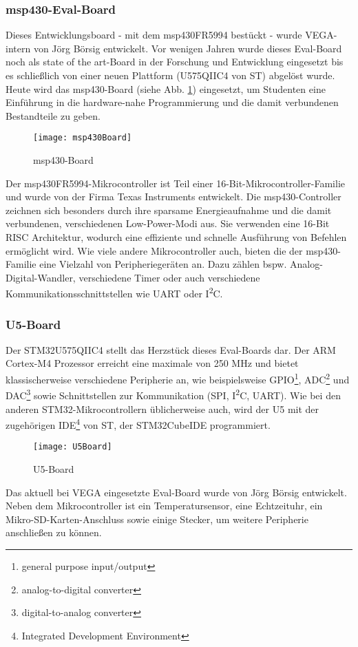 \documentclass[
	letterpaper, %
	10pt, %
]{CSUniSchoolLabReport}
\begin{document}
\begin{spacing}{1.6}
\subsubsection{msp430-Eval-Board}
Dieses Entwicklungsboard - mit dem msp430FR5994 bestückt - wurde VEGA-intern von Jörg Börsig entwickelt. Vor wenigen Jahren wurde dieses Eval-Board noch als \glqq state of the art\grqq -Board in der Forschung und Entwicklung eingesetzt bis es schließlich von einer neuen Plattform (U575QIIC4 von ST) abgelöst wurde. Heute wird das msp430-Board (siehe Abb. \ref{fig:msp430}) eingesetzt, um Studenten eine Einführung in die hardware-nahe Programmierung und die damit verbundenen Bestandteile zu geben.\\
\begin{figure}[H]
    \centering
    \texttt{[image: msp430Board]}
    \caption{msp430-Board}
    \label{fig:msp430}
\end{figure}
Der msp430FR5994-Mikrocontroller ist Teil einer 16-Bit-Mikrocontroller-Familie und wurde von der Firma Texas Instruments entwickelt. Die msp430-Controller zeichnen sich besonders durch ihre sparsame Energieaufnahme und die damit verbundenen, verschiedenen Low-Power-Modi aus. Sie verwenden eine 16-Bit RISC Architektur, wodurch eine effiziente und schnelle Ausführung von Befehlen ermöglicht wird. Wie viele andere Mikrocontroller auch, bieten die der msp430-Familie eine Vielzahl von Peripheriegeräten an. Dazu zählen bspw. Analog-Digital-Wandler, verschiedene Timer oder auch verschiedene Kommunikationsschnittstellen wie UART oder I\textsuperscript{2}C.\\

\subsubsection{U5-Board}
Der STM32U575QIIC4 stellt das Herzstück dieses Eval-Boards dar. Der ARM Cortex-M4 Prozessor erreicht eine maximale von 250 MHz und bietet klassischerweise verschiedene Peripherie an, wie beispielsweise GPIO\footnote{general purpose input/output}, ADC\footnote{analog-to-digital converter} und DAC\footnote{digital-to-analog converter} sowie Schnittstellen zur Kommunikation (SPI, I\textsuperscript{2}C, UART). Wie bei den anderen STM32-Mikrocontrollern üblicherweise auch, wird der U5 mit der zugehörigen IDE\footnote{Integrated Development Environment} von ST, der \glqq STM32CubeIDE\grqq $ $ programmiert.
\begin{figure}[H]
    \centering
    \texttt{[image: U5Board]}
    \caption{U5-Board}
    \label{fig:U5}
\end{figure}
Das aktuell bei VEGA eingesetzte Eval-Board wurde von Jörg Börsig entwickelt. Neben dem Mikrocontroller ist ein Temperatursensor, eine Echtzeituhr, ein Mikro-SD-Karten-Anschluss sowie einige Stecker, um weitere Peripherie anschließen zu können.


\end{spacing}
\end{document}
